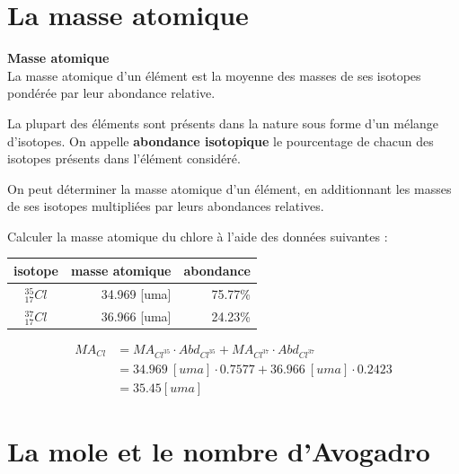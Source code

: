 \documentclass[
  11pt,
  a4paper,
  openany]{book}
\begin{document}
\clearpage

\section{La masse atomique}\label{la-masse-atomique}

\begin{tcolorbox}
\textbf{Masse atomique}\\
La masse atomique d'un élément est la moyenne des masses de ses isotopes pondérée par leur abondance relative.

\end{tcolorbox}

La plupart des éléments sont présents dans la nature sous forme d'un mélange d'isotopes. On appelle \textbf{abondance isotopique} le pourcentage de chacun des isotopes présents dans l'élément considéré.

On peut déterminer la masse atomique d'un élément, en additionnant les masses de ses isotopes multipliées par leurs abondances relatives.

\begin{Exercise}
Calculer la masse atomique du chlore à l'aide des données suivantes :

\end{Exercise}

\begin{longtable}[]{@{}crr@{}}
\toprule\noalign{}
isotope & masse atomique & abondance \\
\midrule\noalign{}
\endhead
\bottomrule\noalign{}
\endlastfoot
\(_{17}^{35}Cl\) & 34.969 {[}uma{]} & 75.77\% \\
\(_{17}^{37}Cl\) & 36.966 {[}uma{]} & 24.23\% \\
\end{longtable}


\begin{Answer}
\[ \begin{split}
    MA_{Cl} &=  MA_{Cl^{35}} \cdot Abd_{Cl^{35}} + MA_{Cl^{37}} \cdot Abd_{Cl^{37}}\\
        &= 34.969~[uma] \cdot 0.7577 + 36.966~[uma] \cdot 0.2423\\
        &= 35.45 [uma]
    \end{split} \]

\end{Answer}

\clearpage

\section{La mole et le nombre d'Avogadro}\label{la-mole-et-le-nombre-davogadro}
\end{document}
